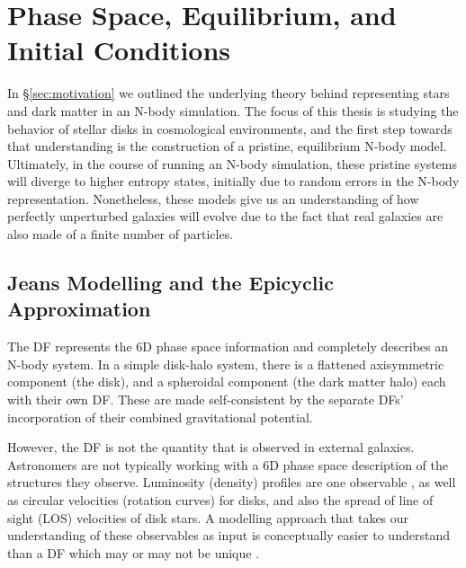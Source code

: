 \section{Phase Space, Equilibrium, and Initial Conditions} \label{sec:galaxy_ics}
In \S\ref{sec:motivation} we outlined the underlying theory behind representing stars and dark matter in an N-body simulation. The focus of this thesis is studying the behavior of stellar disks in cosmological environments, and the first step towards that understanding is the construction of a pristine, equilibrium N-body model. Ultimately, in the course of running an N-body simulation, these pristine systems will diverge to higher entropy states, initially due to random errors in the N-body representation. Nonetheless, these models give us an understanding of how perfectly unperturbed galaxies will evolve due to the fact that real galaxies are also made of a finite number of particles.

\subsection{Jeans Modelling and the Epicyclic Approximation}

The DF represents the 6D phase space information and completely describes an N-body system. In a simple disk-halo system, there is a flattened axisymmetric component (the disk), and a spheroidal component (the dark matter halo) each with their own DF. These are made self-consistent by the separate DFs' incorporation of their combined gravitational potential. 

However, the DF is not the quantity that is observed in external galaxies. Astronomers are not typically working with a 6D phase space description of the structures they observe. Luminosity (density) profiles are one observable , as well as circular velocities (rotation curves) for disks, and also the spread of line of sight (LOS) velocities of disk stars. A modelling approach that takes our understanding of these observables as input is conceptually easier to understand than a DF which may or may not be unique \citep{BT}.

